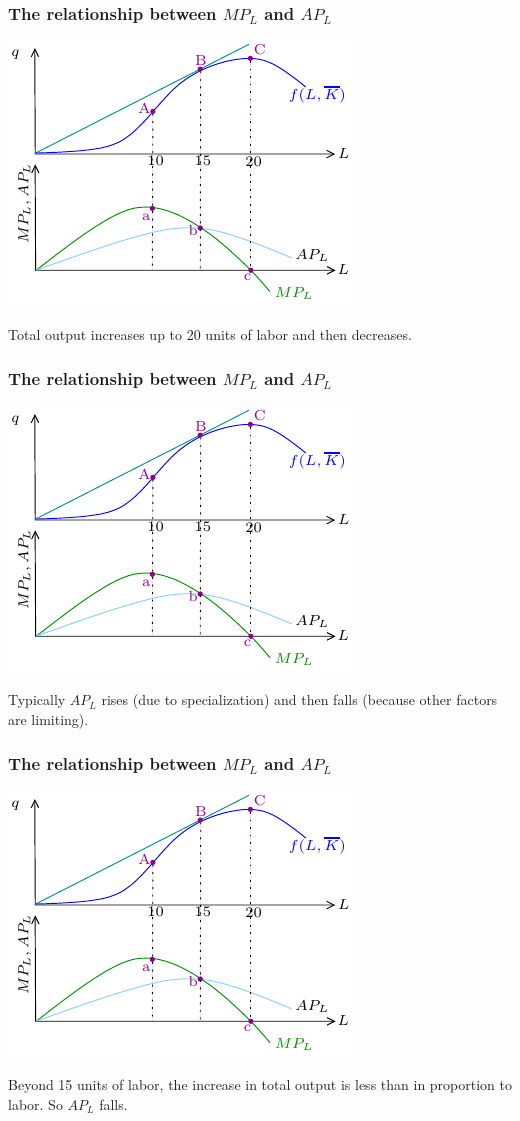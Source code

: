 \documentclass[xcolor=pdftex,dvipsnames]{beamer}
\begin{document}
\begin{frame}
\frametitle{The relationship between $MP_L$ and $AP_L$}
\begin{center}\includegraphics{pics/MPAP}\end{center}
Total output increases up to 20 units of labor and then decreases.
\end{frame}

\begin{frame}
\frametitle{The relationship between $MP_L$ and $AP_L$}
\begin{center}\includegraphics{pics/MPAP}\end{center}
Typically $AP_L$ rises (due to specialization) and then falls (because
other
factors are limiting). 
\end{frame}

\begin{frame}
\frametitle{The relationship between $MP_L$ and $AP_L$}
\begin{center}\includegraphics{pics/MPAP}\end{center}
Beyond 15 units of labor, the increase in total output is less than in
proportion to labor. So $AP_L$ falls.
\end{frame}
\end{document}
